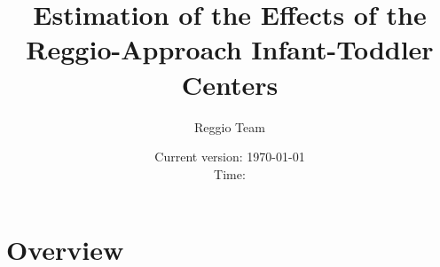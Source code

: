 



\title{Estimation of the Effects of the Reggio-Approach Infant-Toddler Centers}
\author{Reggio Team}
\date{Current version: \today \\ \vspace{1em} Time: \currenttime}
\maketitle

\doublespacing

\section{Overview}





